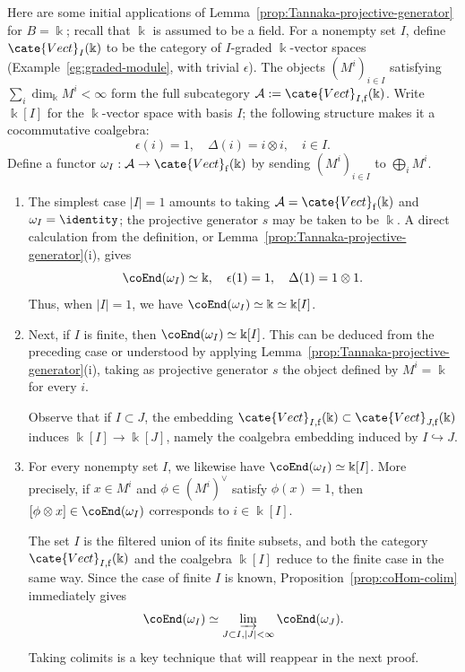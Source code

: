 \begin{example}\label{eg:Tannakian-I-graded-0}
	Here are some initial applications of
	Lemma~\ref{prop:Tannaka-projective-generator} for $B=\Bbbk$; recall
	that $\Bbbk$ is assumed to be a field. For a nonempty set $I$, define
	$\cate{Vect}_I(\Bbbk)$ to be the category of $I$-graded
	$\Bbbk$-vector spaces (Example~\ref{eg:graded-module}, with trivial
	$\epsilon$). The objects $(M^i)_{i\in I}$ satisfying
	$\sum_i\dim_{\Bbbk}M^i<\infty$ form the full subcategory
	$\mathcal{A}:=\cate{Vect}_{I,\mathrm f}(\Bbbk)$. Write $\Bbbk[I]$ for
	the $\Bbbk$-vector space with basis $I$; the following structure makes it
	a cocommutative coalgebra:
	\[ \epsilon(i) = 1, \quad \Delta(i) = i \otimes i, \quad i \in I. \]
	Define a functor
	$\omega_I:\mathcal{A}\to\cate{Vect}_{\mathrm f}(\Bbbk)$ by sending
	$(M^i)_{i\in I}$ to $\bigoplus_iM^i$.
	\begin{enumerate}
		\item The simplest case $|I|=1$ amounts to taking
		$\mathcal{A}=\cate{Vect}_{\mathrm f}(\Bbbk)$ and
		$\omega_I=\identity$; the projective generator $s$ may be taken to be
		$\Bbbk$. A direct calculation from the definition, or
		Lemma~\ref{prop:Tannaka-projective-generator}(i), gives
		\[ \coEnd(\omega_I) \simeq \Bbbk, \quad \epsilon(1) = 1, \quad \Delta(1) = 1 \otimes 1. \]
		Thus, when $|I|=1$, we have
		$\coEnd(\omega_I)\simeq\Bbbk\simeq\Bbbk[I]$.

		\item Next, if $I$ is finite, then
		$\coEnd(\omega_I)\simeq\Bbbk[I]$. This can be deduced from the
		preceding case or understood by applying
		Lemma~\ref{prop:Tannaka-projective-generator}(i), taking as projective
		generator $s$ the object defined by $M^i=\Bbbk$ for every $i$.

		Observe that if $I\subset J$, the embedding
		$\cate{Vect}_{I,\mathrm f}(\Bbbk)\subset
		\cate{Vect}_{J,\mathrm f}(\Bbbk)$ induces
		$\Bbbk[I]\to\Bbbk[J]$, namely the coalgebra embedding induced by
		$I\hookrightarrow J$.

		\item For every nonempty set $I$, we likewise have
		$\coEnd(\omega_I)\simeq\Bbbk[I]$. More precisely, if
		$x\in M^i$ and $\phi\in(M^i)^\vee$ satisfy $\phi(x)=1$, then
		$[\phi\otimes x]\in\coEnd(\omega_I)$ corresponds to
		$i\in\Bbbk[I]$.

		The set $I$ is the filtered union of its finite subsets, and both the
		category $\cate{Vect}_{I,\mathrm f}(\Bbbk)$ and the coalgebra
		$\Bbbk[I]$ reduce to the finite case in the same way. Since the case
		of finite $I$ is known, Proposition~\ref{prop:coHom-colim} immediately
		gives
		\[ \coEnd(\omega_I) \simeq \varinjlim_{J \subset I, |J| < \infty} \coEnd(\omega_J). \]
		Taking colimits is a key technique that will reappear in the next
		proof.
	\end{enumerate}
\end{example}

